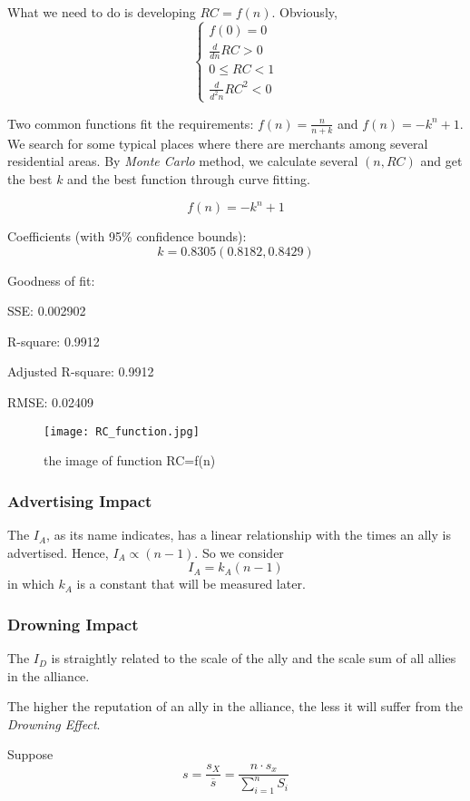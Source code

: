 What we need to do is developing $RC=f(n)$. Obviously,
\[  \begin{cases}
f(0) = 0 \\
\frac{d}{dn} RC > 0 \\
0 \le RC < 1 \\
\frac{d}{d^2n} RC^2 < 0
\end{cases}  \]

Two common functions fit the requirements:
$ f(n) = \frac{n}{n+k} $ and $ f(n) = -k^n+1 $.
We search for some typical places where there are merchants among several residential areas. By \textit{Monte Carlo} method, we calculate several $(n,RC)$ and get the best $k$ and the best function through curve fitting.

\[f(n) = -k^n+1\]

Coefficients (with 95\% confidence bounds):
\[k = 0.8305  (0.8182, 0.8429)\]

\begin{center}
Goodness of fit:

  SSE: 0.002902
  
  R-square: 0.9912
  
  Adjusted R-square: 0.9912
  
  RMSE: 0.02409
\end{center}

\begin{figure}[H]
	\centering
	\texttt{[image: RC\_function.jpg]}
	\caption{the image of function RC=f(n)}
	\label{fig:RC_function}
\end{figure}

\subsubsection{Advertising Impact}
The $I_A$, as its name indicates, has a linear relationship with the times an ally is advertised. Hence, $I_A \propto (n-1)$. So we consider
\[  I_A = k_A (n-1)  \]
in which $k_A$ is a constant that will be measured later.

\subsubsection{Drowning Impact}
The $I_D$ is straightly related to the scale of the ally and the scale sum of all allies in the alliance.

The higher the reputation of an ally in the alliance, the less it will suffer from the \textsl{Drowning Effect}.

Suppose
\[  s = \frac{s_X}{\overline{s}} 
= \frac{n \cdot s_x}{\sum\limits_{i=1}^n S_i}  \]

